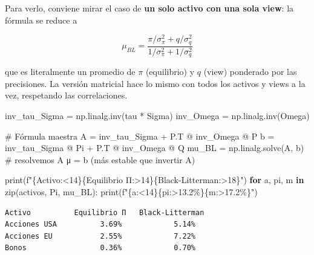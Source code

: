 \documentclass[
  spanish,
  letterpaper,
  DIV=11,
  numbers=noendperiod]{scrreprt}
\newenvironment{Shaded}{\begin{snugshade}}{\end{snugshade}}
\newcommand{\BuiltInTok}[1]{\textcolor[rgb]{0.00,0.23,0.31}{#1}}
\newcommand{\CommentTok}[1]{\textcolor[rgb]{0.37,0.37,0.37}{#1}}
\newcommand{\ControlFlowTok}[1]{\textcolor[rgb]{0.00,0.23,0.31}{\textbf{#1}}}
\newcommand{\KeywordTok}[1]{\textcolor[rgb]{0.00,0.23,0.31}{\textbf{#1}}}
\newcommand{\NormalTok}[1]{\textcolor[rgb]{0.00,0.23,0.31}{#1}}
\newcommand{\OperatorTok}[1]{\textcolor[rgb]{0.37,0.37,0.37}{#1}}
\newcommand{\SpecialCharTok}[1]{\textcolor[rgb]{0.37,0.37,0.37}{#1}}
\newcommand{\SpecialStringTok}[1]{\textcolor[rgb]{0.13,0.47,0.30}{#1}}
\newcommand{\StringTok}[1]{\textcolor[rgb]{0.13,0.47,0.30}{#1}}
\begin{document}
Para verlo, conviene mirar el caso de \textbf{un solo activo con una
sola view}: la fórmula se reduce a

\[\mu_{BL} = \frac{\pi/\sigma_\pi^2 + q/\sigma_q^2}{1/\sigma_\pi^2 + 1/\sigma_q^2}\]

que es literalmente un promedio de \(\pi\) (equilibrio) y \(q\) (view)
ponderado por las precisiones. La versión matricial hace lo mismo con
todos los activos y views a la vez, respetando las correlaciones.

\label{formula-maestra}
\begin{Shaded}
\begin{Highlighting}[]
\NormalTok{inv\_tau\_Sigma }\OperatorTok{=}\NormalTok{ np.linalg.inv(tau }\OperatorTok{*}\NormalTok{ Sigma)}
\NormalTok{inv\_Omega }\OperatorTok{=}\NormalTok{ np.linalg.inv(Omega)}

\CommentTok{\# Fórmula maestra}
\NormalTok{A }\OperatorTok{=}\NormalTok{ inv\_tau\_Sigma }\OperatorTok{+}\NormalTok{ P.T }\OperatorTok{@}\NormalTok{ inv\_Omega }\OperatorTok{@}\NormalTok{ P}
\NormalTok{b }\OperatorTok{=}\NormalTok{ inv\_tau\_Sigma }\OperatorTok{@}\NormalTok{ Pi }\OperatorTok{+}\NormalTok{ P.T }\OperatorTok{@}\NormalTok{ inv\_Omega }\OperatorTok{@}\NormalTok{ Q}
\NormalTok{mu\_BL }\OperatorTok{=}\NormalTok{ np.linalg.solve(A, b)   }\CommentTok{\# resolvemos A μ = b (más estable que invertir A)}

\BuiltInTok{print}\NormalTok{(}\SpecialStringTok{f"}\SpecialCharTok{\{}\StringTok{\textquotesingle{}Activo\textquotesingle{}}\SpecialCharTok{:\textless{}14\}\{}\StringTok{\textquotesingle{}Equilibrio Π\textquotesingle{}}\SpecialCharTok{:\textgreater{}14\}\{}\StringTok{\textquotesingle{}Black{-}Litterman\textquotesingle{}}\SpecialCharTok{:\textgreater{}18\}}\SpecialStringTok{"}\NormalTok{)}
\ControlFlowTok{for}\NormalTok{ a, pi, m }\KeywordTok{in} \BuiltInTok{zip}\NormalTok{(activos, Pi, mu\_BL):}
    \BuiltInTok{print}\NormalTok{(}\SpecialStringTok{f"}\SpecialCharTok{\{}\NormalTok{a}\SpecialCharTok{:\textless{}14\}\{}\NormalTok{pi}\SpecialCharTok{:\textgreater{}13.2\%\}\{}\NormalTok{m}\SpecialCharTok{:\textgreater{}17.2\%\}}\SpecialStringTok{"}\NormalTok{)}
\end{Highlighting}
\end{Shaded}

\begin{verbatim}
Activo          Equilibrio Π   Black-Litterman
Acciones USA          3.69%            5.14%
Acciones EU           2.55%            7.22%
Bonos                 0.36%            0.70%
\end{verbatim}
\end{document}
